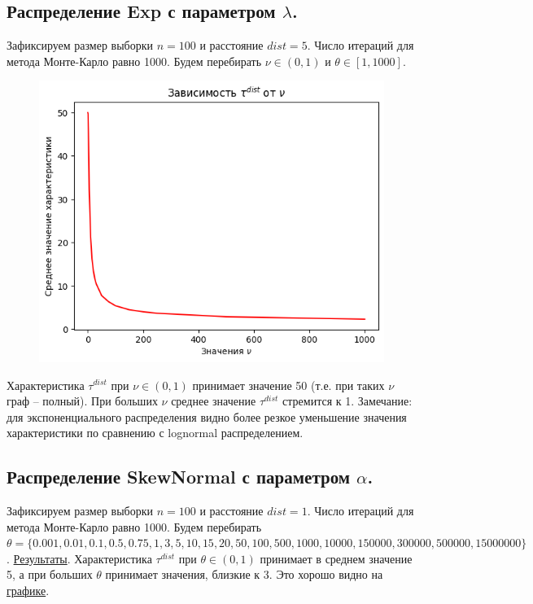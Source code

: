 \documentclass{report}
\begin{document}
\subsection{Распределение Exp с параметром $\lambda$.}
Зафиксируем размер выборки $n = 100$ и расстояние $dist = 5$. Число итераций для метода Монте-Карло равно 1000.
\newline
\newline
Будем перебирать $\nu \in (0, 1)$ и $\theta \in [1, 1000]$.
\newline
\newline
\begin{figure}[h]
    \centering
    \includegraphics[width=0.5\linewidth]{8.png}
\end{figure}
\newline
\newline
Характеристика $\tau^{dist}$ при $\nu \in (0, 1)$ принимает значение 50 (т.е. при таких $\nu$ граф -- полный). 
\newline
\newline
При больших $\nu$ среднее значение $\tau^{dist}$ стремится к 1.
\newline
\newline
Замечание: для экспоненциального распределения видно более резкое уменьшение значения характеристики по сравнению с lognormal распределением.

\subsection{Распределение SkewNormal с параметром $\alpha$.}
Зафиксируем размер выборки $n = 100$ и расстояние $dist = 1$. Число итераций для метода Монте-Карло равно 1000.
\newline
\newline
Будем перебирать \\
$\theta = \{0.001, 0.01, 0.1, 0.5, 0.75, 1, 3, 5, 10, 15, 20, 50, 100, 500, 1000, 10000, 150000, 300000, 500000, 15000000\}$.
\newline
\newline
\href{https://github.com/misshimichka/dm-random-graphs/blob/dmitrii/report/report/fix_construct_skewnorm_mis_dist.png}{Результаты}. 
\newline
\newline
Характеристика $\tau^{dist}$ при $\theta \in (0, 1)$ принимает в среднем значение 5, а при больших $\theta$ принимает значения, близкие к 3. Это хорошо видно на \href{https://github.com/misshimichka/dm-random-graphs/blob/dmitrii/report/report/fix_construct_skewnorm_alpha2avg_mis_dist.png}{графике}.
\end{document}
